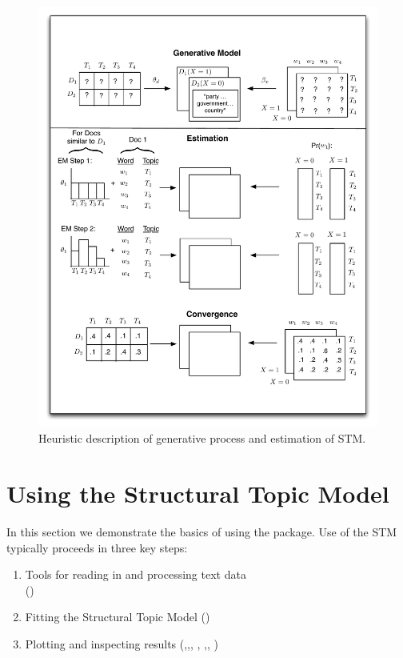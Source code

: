 \documentclass[nojss]{jss}
\begin{document}
\begin{figure}[h!]
  \centering
  \includegraphics[scale=.45]{STMdiagram.pdf}
  \caption{Heuristic description of generative process and estimation of STM.}\label{fig:stmoverview}
\end{figure}

\section{Using the Structural Topic Model}

In this section we demonstrate the basics of using the package. Use of the STM typically proceeds in three key steps:
\begin{enumerate}
\item Tools for reading in and processing text data \\
()
\item Fitting the Structural Topic Model
()
\item Plotting and inspecting results
(,,, , ,, )
\end{enumerate}
\end{document}
